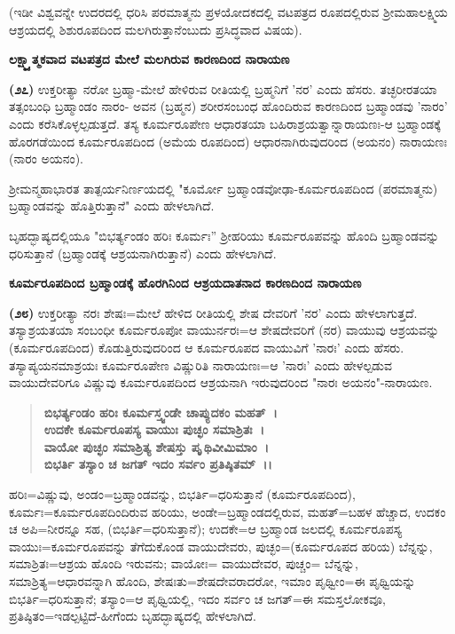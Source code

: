 (ಇಡೀ ವಿಶ್ವವನ್ನೇ ಉದರದಲ್ಲಿ ಧರಿಸಿ ಪರಮಾತ್ಮನು ಪ್ರಳಯೋದಕದಲ್ಲಿ ವಟಪತ್ರದ ರೂಪದಲ್ಲಿರುವ ಶ‍್ರೀಮಹಾಲಕ್ಷ್ಮಿಯ ಆಶ್ರಯದಲ್ಲಿ ಶಿಶುರೂಪದಿಂದ ಮಲಗಿರುತ್ತಾನೆಂಬುದು ಪ್ರಸಿದ್ಧವಾದ ವಿಷಯ).

\begin{center}
\textbf{ಲಕ್ಷ್ಮ್ಯಾತ್ಮಕವಾದ ವಟಪತ್ರದ ಮೇಲೆ ಮಲಗಿರುವ ಕಾರಣದಿಂದ ನಾರಾಯಣ}
\end{center}

\textbf{(೨೭)} ಉಕ್ತರೀತ್ಯಾ ನರೋ ಬ್ರಹ್ಮಾ-ಮೇಲೆ ಹೇಳಿರುವ ರೀತಿಯಲ್ಲಿ ಬ್ರಹ್ಮನಿಗೆ 'ನರ' ಎಂದು ಹೆಸರು. ತಚ್ಛರೀರತಯಾ ತತ್ಸಂಬಂಧಿ ಬ್ರಹ್ಮಾಂಡಂ ನಾರಂ- ಅವನ (ಬ್ರಹ್ಮನ) ಶರೀರಸಂಬಂಧ ಹೊಂದಿರುವ ಕಾರಣದಿಂದ ಬ್ರಹ್ಮಾಂಡವು 'ನಾರಂ' ಎಂದು ಕರೆಸಿಕೊಳ್ಳಲ್ಪಡುತ್ತದೆ. ತಸ್ಯ ಕೂರ್ಮರೂಪೇಣ ಆಧಾರತಯಾ ಬಹಿರಾಶ್ರಯತ್ವಾನ್ನಾರಾಯಣಃ-ಆ ಬ್ರಹ್ಮಾಂಡಕ್ಕೆ ಹೊರಗಡೆಯಿಂದ ಕೂರ್ಮರೂಪದಿಂದ (ಅಮೆಯ ರೂಪದಿಂದ) ಆಧಾರನಾಗಿರುವುದರಿಂದ (ಅಯನಂ) ನಾರಾಯಣಃ (ನಾರಂ ಅಯನಂ).

 ಶ‍್ರೀಮನ್ಮಹಾಭಾರತ ತಾತ್ಪರ್ಯನಿರ್ಣಯದಲ್ಲಿ "ಕೂರ್ಮೋ ಬ್ರಹ್ಮಾಂಡವೋಢಾ-ಕೂರ್ಮ\-ರೂಪದಿಂದ (ಪರಮಾತ್ಮನು) ಬ್ರಹ್ಮಾಂಡವನ್ನು ಹೊತ್ತಿರುತ್ತಾನೆ" ಎಂದು ಹೇಳಲಾಗಿದೆ.

ಬೃಹದ್ಭಾಷ್ಯದಲ್ಲಿಯೂ "ಬಿಭರ್ತ್ಯಂಡಂ ಹರಿಃ ಕೂರ್ಮಃ'' ಶ‍್ರೀಹರಿಯು ಕೂರ್ಮರೂಪವನ್ನು ಹೊಂದಿ ಬ್ರಹ್ಮಾಂಡವನ್ನು ಧರಿಸುತ್ತಾನೆ (ಬ್ರಹ್ಮಾಂಡಕ್ಕೆ ಆಶ್ರಯನಾಗಿರುತ್ತಾನೆ) ಎಂದು ಹೇಳಲಾಗಿದೆ.

\newpage

\begin{center}
\textbf{ಕೂರ್ಮರೂಪದಿಂದ ಬ್ರಹ್ಮಾಂಡಕ್ಕೆ ಹೊರಗಿನಿಂದ ಆಶ್ರಯದಾತನಾದ ಕಾರಣದಿಂದ ನಾರಾಯಣ}
\end{center}

\textbf{(೨೮)} ಉಕ್ತರೀತ್ಯಾ ನರಃ ಶೇಷಃ=ಮೇಲೆ ಹೇಳಿದ ರೀತಿಯಲ್ಲಿ ಶೇಷ ದೇವರಿಗೆ 'ನರ' ಎಂದು ಹೇಳಲಾಗುತ್ತದೆ. ತಸ್ಯಾಶ್ರಯತಯಾ ಸಂಬಂಧೀ ಕೂರ್ಮರೂಪೋ ವಾಯು\-ರ್ನರಃ=ಆ ಶೇಷದೇವರಿಗೆ (ನರ) ವಾಯುವು ಆಶ್ರಯವನ್ನು (ಕೂರ್ಮರೂಪದಿಂದ) ಕೊಡುತ್ತಿರುವುದರಿಂದ ಆ ಕೂರ್ಮರೂಪದ ವಾಯುವಿಗೆ 'ನಾರಃ' ಎಂದು ಹೆಸರು. ತಸ್ಯಾಪ್ಯಯನಮಾಶ್ರಯಃ ಕೂರ್ಮರೂಪೇಣ ವಿಷ್ಣುರಿತಿ ನಾರಾಯಣಃ=ಆ 'ನಾರಃ' ಎಂದು ಹೇಳಲ್ಪಡುವ ವಾಯುದೇವರಿಗೂ ವಿಷ್ಣುವು ಕೂರ್ಮರೂಪದಿಂದ ಆಶ್ರಯನಾಗಿ ಇರುವುದರಿಂದ "ನಾರಃ ಅಯನಂ"-ನಾರಾಯಣ.

\begin{verse}
\textbf{ಬಿಭರ್ತ್ಯಂಡಂ ಹರಿಃ ಕೂರ್ಮಸ್ತ್ವಂಡೇ ಚಾಪ್ಯುದಕಂ ಮಹತ್~।}\\\textbf{ಉದಕೇ ಕೂರ್ಮರೂಪಸ್ಯ ವಾಯುಃ ಪುಚ್ಛಂ ಸಮಾಶ್ರಿತಃ~।}\\\textbf{ವಾಯೋ ಪುಚ್ಛಂ ಸಮಾಶ್ರಿತ್ಯ ಶೇಷಸ್ತು ಪೃೃಥಿವೀಮಿಮಾಂ~।}\\\textbf{ಬಿಭರ್ತಿ ತಸ್ಯಾಂ ಚ ಜಗತ್ ಇದಂ ಸರ್ವಂ ಪ್ರತಿಷ್ಠಿತಮ್~।।}
\end{verse}

ಹರಿಃ=ವಿಷ್ಣುವು, ಅಂಡಂ=ಬ್ರಹ್ಮಾಂಡವನ್ನು, ಬಿಭರ್ತಿ=ಧರಿಸುತ್ತಾನೆ (ಕೂರ್ಮರೂಪದಿಂದ), ಕೂರ್ಮಃ=ಕೂರ್ಮರೂಪದಿಂದಿರುವ ಹರಿಯು, ಅಂಡೇ=ಬ್ರಹ್ಮಾಂಡದಲ್ಲಿರುವ, ಮಹತ್=ಬಹಳ ಹೆಚ್ಚಾದ, ಉದಕಂ ಚ ಅಪಿ=ನೀರನ್ನೂ ಸಹ, (ಬಿಭರ್ತಿ=ಧರಿಸುತ್ತಾನೆ); ಉದಕೇ=ಆ ಬ್ರಹ್ಮಾಂಡ ಜಲದಲ್ಲಿ ಕೂರ್ಮರೂಪಸ್ಯ ವಾಯುಃ=ಕೂರ್ಮರೂಪವನ್ನು ತೆಗೆದುಕೊಂಡ ವಾಯುದೇವರು, ಪುಚ್ಛಂ=(ಕೂರ್ಮರೂಪದ ಹರಿಯ) ಬೆನ್ನನ್ನು, ಸಮಾಶ್ರಿತಃ=\-ಆಶ್ರಯ ಹೊಂದಿ ಇರುವನು; ವಾಯೋಃ= ವಾಯುದೇವರ, ಪುಚ್ಚಂ= ಬೆನ್ನನ್ನು, ಸಮಾಶ್ರಿತ್ಯ=\-ಆಧಾರವನ್ನಾಗಿ ಹೊಂದಿ, ಶೇಷಃತು=ಶೇಷದೇವರಾದರೋ, ಇಮಾಂ ಪೃಥ್ವೀಂ=ಈ ಪೃಥ್ವಿಯನ್ನು ಬಿಭರ್ತಿ=ಧರಿಸುತ್ತಾನೆ; ತಸ್ಯಾಂ=ಆ ಪೃಥ್ವಿಯಲ್ಲಿ, ಇದಂ ಸರ್ವಂ ಚ ಜಗತ್=ಈ ಸಮಸ್ತಲೋಕವೂ, ಪ್ರತಿಷ್ಠಿತಂ=ಇಡಲ್ಪಟ್ಟಿದೆ-ಹೀಗೆಂದು ಬೃಹದ್ಭಾಷ್ಯದಲ್ಲಿ ಹೇಳಲಾಗಿದೆ.


